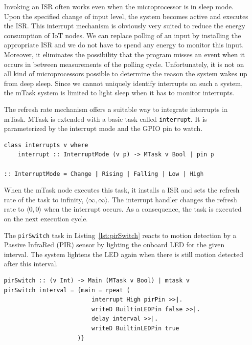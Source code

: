 \documentclass[runningheads]{llncs}
\newcommand{\CleanInline}[1]{\lstinline[language=Clean]!#1!}
\newcommand{\prog}[1]{\CleanInline{#1}}
\begin{document}
Invoking an ISR often works even when the microprocessor is in sleep mode.
Upon the specified change of input level, the system becomes active and executes the {ISR}.
This interrupt mechanism is obviously very suited to reduce the energy consumption of IoT nodes.
We can replace polling of an input by installing the appropriate ISR and we do not have to spend any energy to monitor this input.
Moreover, it eliminates the possibility that the program misses an event when it occurs in between measurements of the polling cycle.
Unfortunately, it is not on all kind of microprocessors possible to determine the reason the system wakes up from deep sleep.
Since we cannot uniquely identify interrupts on such a system, the mTask system is limited to light sleep when it has to monitor interrupts.  

The refresh rate mechanism offers a suitable way to integrate interrupts in mTask.
MTask is extended with a basic task called \prog{interrupt}.
It is parameterized by the interrupt mode and the GPIO pin to watch.

\begin{lstlisting}[language=Clean,caption={Definition of the interrupt class in mTask.},label={lst:interrupt}]
class interrupts v where
    interrupt :: InterruptMode (v p) -> MTask v Bool | pin p

:: InterruptMode = Change | Rising | Falling | Low | High
\end{lstlisting}

When the mTask node executes this task, it installs a ISR and sets the refresh rate of the task to infinity, $\langle \infty, \infty \rangle$.
The interrupt handler changes the refresh rate to $\langle 0, 0 \rangle$ when the interrupt occurs.
As a consequence, the task is executed on the next execution cycle.

The \prog{pirSwitch} task in Listing~\ref{lst:pirSwitch} reacts to motion detection by a Passive InfraRed (PIR) sensor by lighting the onboard LED for the given interval.
The system lightens the LED again when there is still motion detected after this interval.

\begin{lstlisting}[language=Clean,caption={Example of a toggle switch with interrupts},label={lst:pirSwitch}]
pirSwitch :: (v Int) -> Main (MTask v Bool) | mtask v
pirSwitch interval = {main = rpeat (
                         interrupt High pirPin >>|.
                         writeD BuiltinLEDPin false >>|.
                         delay interval >>|.
                         writeD BuiltinLEDPin true
                     )}
\end{lstlisting}
\end{document}
